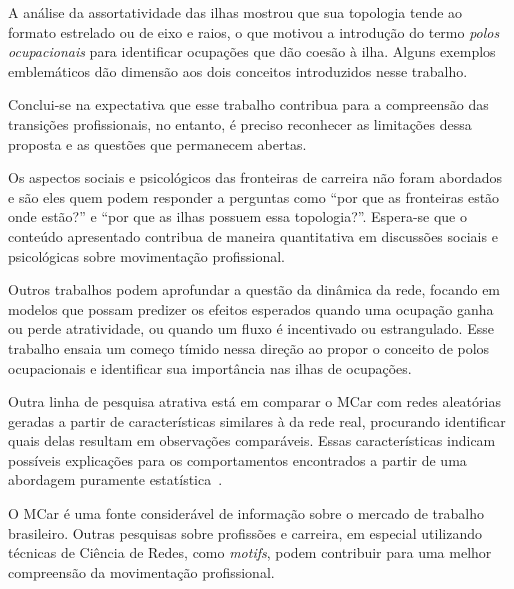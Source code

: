 \documentclass[12pt,a4paper]{article}
\begin{document}
A análise da assortatividade das ilhas mostrou que sua topologia tende ao formato estrelado ou de eixo e raios, o que motivou a introdução do termo \textit{polos ocupacionais} para identificar ocupações que dão coesão à ilha. Alguns exemplos emblemáticos dão dimensão aos dois conceitos introduzidos nesse trabalho.

Conclui-se na expectativa que esse trabalho contribua para a compreensão das transições profissionais, no entanto, é preciso reconhecer as limitações dessa proposta e as questões que permanecem abertas.

Os aspectos sociais e psicológicos das fronteiras de carreira não foram abordados e são eles quem podem responder a perguntas como \enquote{por que as fronteiras estão onde estão?} e \enquote{por que as ilhas possuem essa topologia?}. Espera-se que o conteúdo apresentado contribua de maneira quantitativa em discussões sociais e psicológicas sobre movimentação profissional.

Outros trabalhos podem aprofundar a questão da dinâmica da rede, focando em modelos que possam predizer os efeitos esperados quando uma ocupação ganha ou perde atratividade, ou quando um fluxo é incentivado ou estrangulado. Esse trabalho ensaia um começo tímido nessa direção ao propor o conceito de polos ocupacionais e identificar sua importância nas ilhas de ocupações.

Outra linha de pesquisa atrativa está em comparar o MCar com redes aleatórias geradas a partir de características similares à da rede real, procurando identificar quais delas resultam em observações comparáveis. Essas características indicam possíveis explicações para os comportamentos encontrados a partir de uma abordagem puramente estatística~\cite{Barabasi2016-rn}.

O MCar é uma fonte considerável de informação sobre o mercado de trabalho brasileiro. Outras pesquisas sobre profissões e carreira, em especial utilizando técnicas de Ciência de Redes, como \textit{motifs}, podem contribuir para uma melhor compreensão da movimentação profissional.

\FloatBarrier %

\def\refname{REFERÊNCIAS BIBLIOGRÁFICAS}


\end{document}
